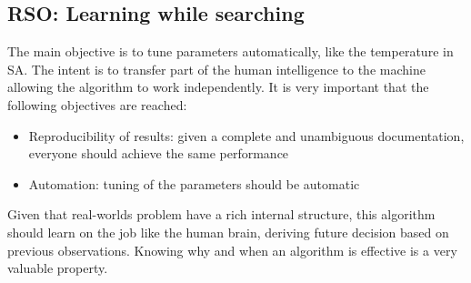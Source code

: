\documentclass[10pt]{article}
\begin{document}
\subsection{RSO: Learning while searching}
The main objective is to tune parameters automatically, like the temperature in SA. The intent is to transfer part of the human intelligence to the machine allowing the algorithm to work independently. It is very important that the following objectives are reached:
\begin{itemize}
\item{Reproducibility of results: given a complete and unambiguous documentation, everyone should achieve the same performance}
\item{Automation: tuning of the parameters should be automatic}
\end{itemize}
Given that real-worlds problem have a rich internal structure, this algorithm should learn on the job like the human brain, deriving future decision based on previous observations. Knowing why and when an algorithm is effective is a very valuable property. 
\end{document}
